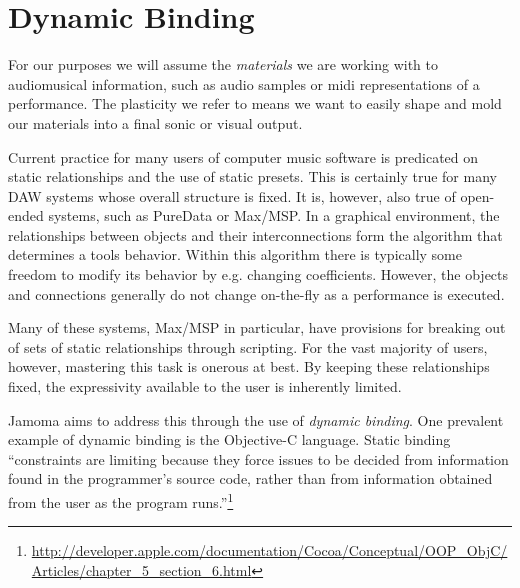 \documentclass{article}
\begin{document}


\section{Dynamic Binding} %
\label{sec:dynamic_binding}

For our purposes we will assume the \emph{materials} we are working with to audiomusical information, such as audio samples or midi representations of a performance. The plasticity we refer to means we want to easily shape and mold our materials into a final sonic or visual output.

Current practice for many users of computer music software is predicated on static relationships and the use of static presets. This is certainly true for many DAW systems whose overall structure is fixed. It is, however, also true of open-ended systems, such as PureData or Max/MSP. In a graphical environment, the relationships between objects and their interconnections form the algorithm that determines a tools behavior. Within this algorithm there is typically some freedom to modify its behavior by e.g. changing coefficients. However, the objects and connections generally do not change on-the-fly as a performance is executed.

Many of these systems, Max/MSP in particular, have provisions for breaking out of sets of static relationships through scripting. For the vast majority of users, however, mastering this task is onerous at best. By keeping these relationships fixed, the expressivity available to the user is inherently limited.

Jamoma aims to address this through the use of \emph{dynamic binding}. One prevalent example of dynamic binding is the Objective-C language. Static binding ``constraints are limiting because they force issues to be decided from information found in the programmer’s source code, rather than from information obtained from the user as the program runs.''\footnote{\url{http://developer.apple.com/documentation/Cocoa/Conceptual/OOP_ObjC/Articles/chapter_5_section_6.html}}
\end{document}
